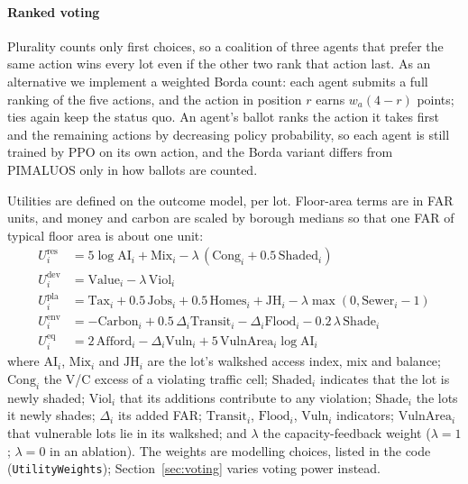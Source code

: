 \documentclass[preprint,12pt]{elsarticle}
\begin{document}
\paragraph{Ranked voting} Plurality counts only first choices, so a coalition of three agents that prefer the same action wins every lot even if the other two rank that action last. As an alternative we implement a weighted Borda count: each agent submits a full ranking of the five actions, and the action in position $r$ earns $w_a(4-r)$ points; ties again keep the status quo. An agent's ballot ranks the action it takes first and the remaining actions by decreasing policy probability, so each agent is still trained by PPO on its own action, and the Borda variant differs from PIMALUOS only in how ballots are counted.

Utilities are defined on the outcome model, per lot. Floor-area terms are in FAR units, and money and carbon are scaled by borough medians so that one FAR of typical floor area is about one unit:
\begin{align}
U^{\text{res}}_i &= 5\log\mathrm{AI}_i + \mathrm{Mix}_i - \lambda\,(\mathrm{Cong}_i + 0.5\,\mathrm{Shaded}_i) \label{eq:res}\\
U^{\text{dev}}_i &= \mathrm{Value}_i - \lambda\, \mathrm{Viol}_i\\
U^{\text{pla}}_i &= \mathrm{Tax}_i + 0.5\,\mathrm{Jobs}_i + 0.5\,\mathrm{Homes}_i + \mathrm{JH}_i - \lambda \max(0, \mathrm{Sewer}_i - 1)\\
U^{\text{env}}_i &= -\mathrm{Carbon}_i + 0.5\,\Delta_i \mathrm{Transit}_i - \Delta_i \mathrm{Flood}_i - 0.2\,\lambda\, \mathrm{Shade}_i\\
U^{\text{eq}}_i &= 2\,\mathrm{Afford}_i - \Delta_i \mathrm{Vuln}_i + 5\,\mathrm{VulnArea}_i \log\mathrm{AI}_i \label{eq:eq}
\end{align}
where $\mathrm{AI}_i$, $\mathrm{Mix}_i$ and $\mathrm{JH}_i$ are the lot's walkshed access index, mix and balance; $\mathrm{Cong}_i$ the V/C excess of a violating traffic cell; $\mathrm{Shaded}_i$ indicates that the lot is newly shaded; $\mathrm{Viol}_i$ that its additions contribute to any violation; $\mathrm{Shade}_i$ the lots it newly shades; $\Delta_i$ its added FAR; $\mathrm{Transit}_i$, $\mathrm{Flood}_i$, $\mathrm{Vuln}_i$ indicators; $\mathrm{VulnArea}_i$ that vulnerable lots lie in its walkshed; and $\lambda$ the capacity-feedback weight ($\lambda=1$; $\lambda=0$ in an ablation). The weights are modelling choices, listed in the code (\texttt{UtilityWeights}); Section~\ref{sec:voting} varies voting power instead.
\end{document}
